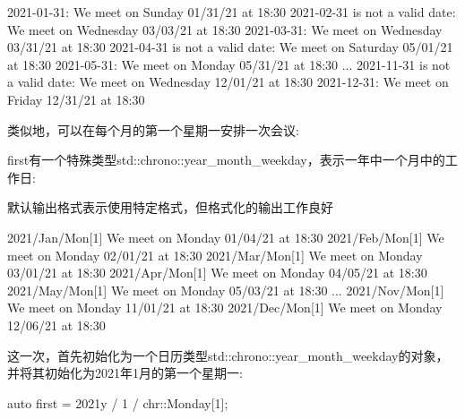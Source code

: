 \begin{shell}
2021-01-31:
 We meet on Sunday 01/31/21 at 18:30
2021-02-31 is not a valid date:
 We meet on Wednesday 03/03/21 at 18:30
2021-03-31:
 We meet on Wednesday 03/31/21 at 18:30
2021-04-31 is not a valid date:
 We meet on Saturday 05/01/21 at 18:30
2021-05-31:
 We meet on Monday 05/31/21 at 18:30
...
2021-11-31 is not a valid date:
 We meet on Wednesday 12/01/21 at 18:30
2021-12-31:
 We meet on Friday 12/31/21 at 18:30
\end{shell}


类似地，可以在每个月的第一个星期一安排一次会议:



first有一个特殊类型std::chrono::year\_month\_weekday，表示一年中一个月中的工作日:

默认输出格式表示使用特定格式，但格式化的输出工作良好

\begin{shell}
2021/Jan/Mon[1]
 We meet on Monday 01/04/21 at 18:30
2021/Feb/Mon[1]
 We meet on Monday 02/01/21 at 18:30
2021/Mar/Mon[1]
 We meet on Monday 03/01/21 at 18:30
2021/Apr/Mon[1]
 We meet on Monday 04/05/21 at 18:30
2021/May/Mon[1]
 We meet on Monday 05/03/21 at 18:30
...
2021/Nov/Mon[1]
 We meet on Monday 11/01/21 at 18:30
2021/Dec/Mon[1]
 We meet on Monday 12/06/21 at 18:30
\end{shell}


这一次，首先初始化为一个日历类型std::chrono::year\_month\_weekday的对象，并将其初始化为2021年1月的第一个星期一:

\begin{shell}
auto first = 2021y / 1 / chr::Monday[1];
\end{shell}

